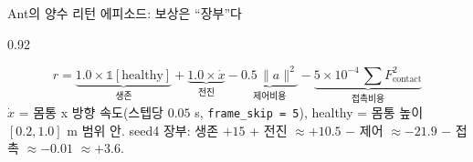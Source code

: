 \begin{frame}{Ant의 양수 리턴 에피소드: 보상은 ``장부''다}
\begin{center}\begin{varwidth}{0.92\textwidth}
  
  \[
    r = \underbrace{1.0 \times \mathbb{1}[\text{healthy}]}_{\text{생존}}
    + \underbrace{1.0 \times \dot{x}}_{\text{전진}}
    - \underbrace{0.5\,\|a\|^{2}}_{\text{제어비용}}
    - \underbrace{5\times 10^{-4}\,\sum F_{\text{contact}}^{2}}_{\text{접촉비용}}
  \]
  \small
  $\dot{x}$ = 몸통 x 방향 속도(스텝당 $0.05$ s, \texttt{frame\_skip = 5}),
  healthy = 몸통 높이 $[0.2, 1.0]$ m 범위 안. seed4 장부:
  생존 $+15$ + 전진 $\approx +10.5$ − 제어 $\approx -21.9$ − 접촉
  $\approx -0.01$ $\approx +3.6$.
\end{varwidth}\end{center}
\end{frame}
